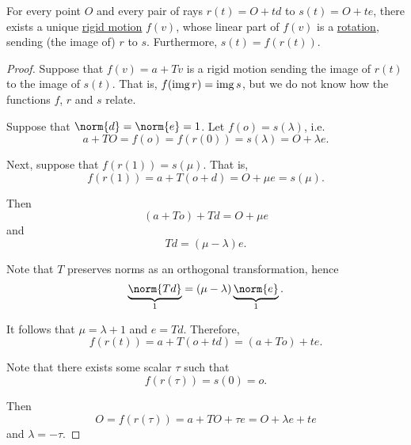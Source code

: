 \begin{proposition}\label{thm:plane_ray_rotation}
  For every point \( O \) and every pair of rays \( r(t) = O + td \) to \( s(t) = O + te \), there exists a unique \hyperref[def:rigid_motion]{rigid motion} \( f(v) \), whose linear part of \( f(v) \) is a \hyperref[def:rigid_motion/rotation]{rotation}, sending (the image of) \( r \) to \( s \). Furthermore, \( s(t) = f(r(t)) \).
\end{proposition}
\begin{proof}
   Suppose that \( f(v) = a + Tv \) is a rigid motion sending the image of \( r(t) \) to the image of \( s(t) \). That is, \( f(\operatorname{img} r) = \operatorname{img} s \), but we do not know how the functions \( f \), \( r \) and \( s \) relate.

  Suppose that \( \norm{d} = \norm{e} = 1 \). Let \( f(o) = s(\lambda) \), i.e.
  \begin{equation*}
    a + T O = f(o) = f(r(0)) = s(\lambda) = O + \lambda e.
  \end{equation*}

  Next, suppose that \( f(r(1)) = s(\mu) \). That is,
  \begin{equation*}
    f(r(1)) = a + T (o + d) = O + \mu e = s(\mu).
  \end{equation*}

  Then
  \begin{equation*}
    (a + T o) + T d = O + \mu e
  \end{equation*}
  and
  \begin{equation*}
    Td = (\mu - \lambda) e.
  \end{equation*}

  Note that \( T \) preserves norms as an orthogonal transformation, hence
  \begin{equation*}
    \underbrace{\norm{Td}}_{1} = (\mu - \lambda) \underbrace{\norm{e}}_{1}.
  \end{equation*}

  It follows that \( \mu = \lambda + 1 \) and \( e = Td \). Therefore,
  \begin{equation*}
    f(r(t)) = a + T(o + td) = (a + To) + t e.
  \end{equation*}

  Note that there exists some scalar \( \tau \) such that
  \begin{equation*}
    f(r(\tau)) = s(0) = o.
  \end{equation*}

  Then
  \begin{equation*}
    O = f(r(\tau)) = a + T O + \tau e = O + \lambda e + t e
  \end{equation*}
  and \( \lambda = -\tau \).


\end{proof}
